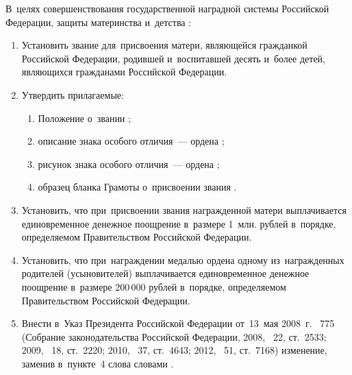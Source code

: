 \documentclass{../president-decree}
\providecommand*{\asbuk}{}
\begin{document}
	
	
	\lettrine{В}{}~целях совершенствования государственной наградной системы Российской Федерации, защиты материнства и~детства :
	
	\begin{enumerate}
		\item Установить звание  для~присвоения матери, являющейся гражданкой Российской Федерации, родившей и~воспитавшей десять и~более детей, являющихся гражданами Российской Федерации.
		
		\item Утвердить прилагаемые:
		\begin{enumerate}[label=\asbuk*), ref=\asbuk*]
			\item Положение о~звании ;
			
			\item описание знака особого отличия~--- ордена ;
			
			\item рисунок знака особого отличия~--- ордена ;
			
			\item образец бланка Грамоты о~присвоении звания .
		\end{enumerate}
	
		\sloppy \item Установить, что при~присвоении звания  награжденной матери выплачивается единовременное денежное поощрение в~размере 1~млн. рублей в~порядке, определяемом Правительством Российской Федерации.
		
		\item Установить, что при~награждении медалью ордена  одному из~награжденных родителей (усыновителей) выплачивается единовременное денежное поощрение в~размере 200\,000 рублей в~порядке, определяемом Правительством Российской Федерации.
		
		\item Внести в~Указ Президента Российской Федерации от~13~мая 2008~г. \textnumero~775  (Собрание законодательства Российской Федерации, 2008, \textnumero~22, ст.~2533; 2009, \textnumero~18, ст.~2220; 2010, \textnumero~37, ст.~4643; 2012, \textnumero~51, ст.~7168) изменение, заменив в~пункте~4 слова  словами .
		

\end{enumerate}
\end{document}
